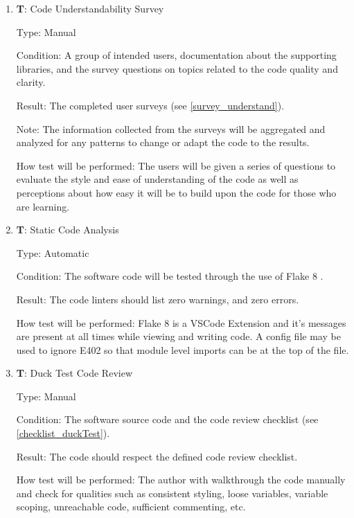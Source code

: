 \documentclass[12pt, titlepage]{article}
\newcounter{testnum} %
\begin{document}
\begin{enumerate}

  \item{\textbf{T\thetestnum \label{T_understandSurvey}}: Code Understandability Survey\\}
            
  Type: Manual
            
  Condition: A group of intended users, 
  documentation about the supporting libraries, and the survey questions on topics related 
  to the code quality and clarity.
            
  Result: The completed user surveys (see \ref{survey_understand}).
            
  Note: The information collected from the surveys
  will be aggregated and analyzed for any patterns to
  change or adapt the code to the results.
            
  How test will be performed: The users will be given a series of questions to evaluate 
  the style and ease of understanding of the code as well as perceptions about how easy it will 
  be to build upon the code for those who are learning.

  \item{\textbf{T\thetestnum \label{T_linters}}: Static Code Analysis\\}

  Type: Automatic
            
  Condition: The software code will be tested through the use of Flake 8 \citep{Flake8}.
            
  Result: The code linters should list zero warnings, and zero errors.
            
  How test will be performed: Flake 8 is a VSCode Extension and it's messages are present at all times while 
  viewing and writing code. A config file may be used to ignore E402 so that module level imports can be at the top of the file.

  \item{\textbf{T\thetestnum \label{T_duckTest}}: Duck Test Code Review\\}

  Type: Manual
            
  Condition: The software source code and the code review checklist (see \ref{checklist_duckTest}).
            
  Result: The code should respect the defined code review checklist.
            
  How test will be performed: The author with walkthrough the code manually and check for qualities
    such as consistent styling, loose variables, variable scoping, unreachable code, 
    sufficient commenting, etc.
\end{enumerate}
\end{document}
